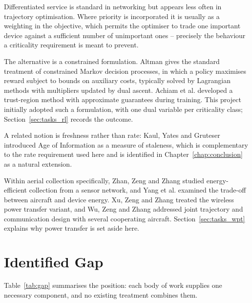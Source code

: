 Differentiated service is standard in networking but appears less often in trajectory optimisation. Where priority is incorporated it is usually as a weighting in the objective, which permits the optimiser to trade one important device against a sufficient number of unimportant ones -- precisely the behaviour a criticality requirement is meant to prevent.

The alternative is a constrained formulation. Altman \cite{altman1999constrained} gives the standard treatment of constrained Markov decision processes, in which a policy maximises reward subject to bounds on auxiliary costs, typically solved by Lagrangian methods with multipliers updated by dual ascent. Achiam et al. \cite{achiam2017constrained} developed a trust-region method with approximate guarantees during training. This project initially adopted such a formulation, with one dual variable per criticality class; Section~\ref{sec:tasks_rl} records the outcome.

A related notion is freshness rather than rate: Kaul, Yates and Gruteser \cite{kaul2012real} introduced Age of Information as a measure of staleness, which is complementary to the rate requirement used here and is identified in Chapter~\ref{chap:conclusion} as a natural extension.

Within aerial collection specifically, Zhan, Zeng and Zhang \cite{zhan2018energy} studied energy-efficient collection from a sensor network, and Yang et al. \cite{yang2018energy} examined the trade-off between aircraft and device energy. Xu, Zeng and Zhang \cite{xu2018uav} treated the wireless power transfer variant, and Wu, Zeng and Zhang \cite{wu2018joint} addressed joint trajectory and communication design with several cooperating aircraft. Section~\ref{sec:tasks_wpt} explains why power transfer is set aside here.

\section{Identified Gap}
\label{sec:lit_gap}

Table~\ref{tab:gap} summarises the position: each body of work supplies one necessary component, and no existing treatment combines them.

